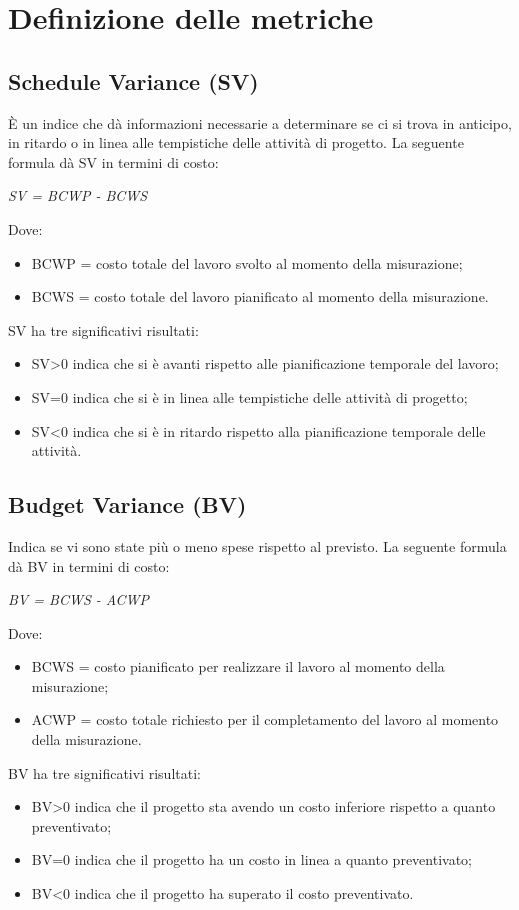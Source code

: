 \section{Definizione delle metriche}

  \subsection{Schedule Variance (SV)}
  È un indice che dà informazioni necessarie a determinare
  se ci si trova in anticipo, in ritardo o in linea alle tempistiche delle attività di
  progetto. La seguente formula dà SV in termini di costo:
  \begin{center}
    \emph{SV = BCWP - BCWS}
  \end{center}
  Dove:
  \begin{itemize}
    \item BCWP = costo totale del lavoro svolto al momento della misurazione;
    \item BCWS = costo totale del lavoro pianificato al momento della misurazione.
  \end{itemize}
  SV ha tre significativi risultati:
  \begin{itemize}
    \item SV>0 indica che si è avanti rispetto alle pianificazione temporale del lavoro;
    \item SV=0 indica che si è in linea alle tempistiche delle attività di progetto;
    \item SV<0 indica che si è in ritardo rispetto alla pianificazione temporale delle attività.
  \end{itemize}

  \subsection{Budget Variance (BV)}
  Indica se vi sono state più o meno spese rispetto al previsto.
  La seguente formula dà BV in termini di costo:
  \begin{center}
    \emph{BV = BCWS - ACWP}
  \end{center}
  Dove:
  \begin{itemize}
    \item BCWS = costo pianificato per realizzare il lavoro al momento della misurazione;
    \item ACWP = costo totale richiesto per il completamento del lavoro al momento della misurazione.
  \end{itemize}
  BV ha tre significativi risultati:
  \begin{itemize}
    \item BV>0 indica che il progetto sta avendo un costo inferiore rispetto a quanto preventivato;
    \item BV=0 indica che il progetto ha un costo in linea a quanto preventivato;
    \item BV<0 indica che il progetto ha superato il costo preventivato.
  \end{itemize}

